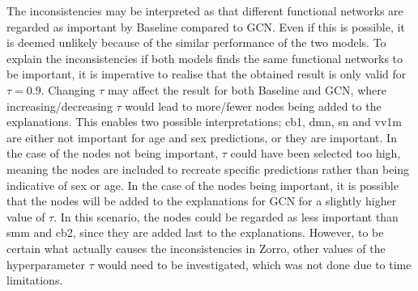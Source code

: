 
The inconsistencies may be interpreted as that different functional networks are regarded as important by Baseline compared to GCN. Even if this is possible, it is deemed unlikely because of the similar performance of the two models. To explain the inconsistencies if both models finds the same functional networks to be important, it is imperative to realise that the obtained result is only valid for $\tau = 0.9$. Changing $\tau$ may affect the result for both Baseline and GCN, where increasing/decreasing $\tau$ would lead to more/fewer nodes being added to the explanations. This enables two possible interpretations; \acrshort{cb1}, \acrshort{dmn}, \acrshort{sn} and \acrshort{vv1m} are either not important for age and sex predictions, or they are important. In the case of the nodes not being important, $\tau$ could have been selected too high, meaning the nodes are included to recreate specific predictions rather than being indicative of sex or age. 
In the case of the nodes being important, it is possible that the nodes will be added to the explanations for GCN for a slightly higher value of $\tau$. In this scenario, the nodes could be regarded as less important than \acrshort{smm} and \acrshort{cb2}, since they are added last to the explanations. However, to be certain what actually causes the inconsistencies in Zorro, other values of the hyperparameter $\tau$ would need to be investigated, which was not done due to time limitations. 



